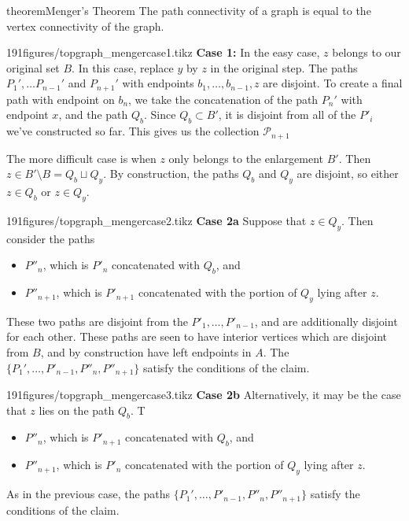\begin{doubledpage}{theorem}{Menger's Theorem}{
	The path connectivity of a graph is equal to the vertex connectivity of the graph.  }
\begin{paragraphfigureenv}{191figures/topgraph_mengercase1.tikz}
    \textbf{Case 1:} In the easy case, $z$ belongs to our original set $B$. In this case, replace $y$ by $z$ in the original step. The paths $P_1', \ldots P_{n-1}'$ and $P_{n+1}'$ with endpoints $b_1, \ldots, b_{n-1}, z$ are disjoint. To create a final path with endpoint on $b_n$, we take the concatenation of the path $P_{n}'$ with endpoint $x$, and the path $Q_b$. Since $Q_b\subset B'$, it is disjoint from all of the $P'_i$ we've constructed so far. This gives us the collection $\mathcal P_{n+1}$ 
\end{paragraphfigureenv}
The more difficult case is when  $z$ only belongs to the enlargement  $B'$. Then $z\in B'\setminus B = Q_b\sqcup Q_y$. By construction, the paths $Q_b$ and $Q_y$ are disjoint, so either $z\in Q_b$ or $z\in Q_y$. 
\begin{paragraphfigureenv}{191figures/topgraph_mengercase2.tikz} \textbf{Case 2a}
    Suppose that $z\in Q_y$. Then consider the paths 
    \begin{itemize}
        \item $P''_n$, which is $P'_n$ concatenated with $Q_b$, and 
        \item $P''_{n+1}$, which is $P'_{n+1}$ concatenated with the portion of $Q_y$ lying after $z$. 
    \end{itemize} 
    These two paths are disjoint from the $P'_1, \ldots, P'_{n-1}$, and are additionally disjoint for each other. These paths are seen to have interior vertices which are disjoint from $B$, and by construction have left endpoints in $A$. The $\{P_1', \ldots, P'_{n-1}, P''_n, P''_{n+1}\}$ satisfy the conditions of the claim. 
\end{paragraphfigureenv}

\begin{paragraphfigureenv}{191figures/topgraph_mengercase3.tikz}
    \textbf{Case 2b}
     Alternatively, it may be the case that $z$ lies on the path $Q_b$. T
     \begin{itemize}
         \item $P''_n$, which is $P'_{n+1}$ concatenated with $Q_b$, and 
         \item $P''_{n+1}$, which is $P'_{n}$ concatenated with the portion of $Q_y$ lying after $z$. 
     \end{itemize}  
     As in the previous case, the paths $\{P_1', \ldots, P'_{n-1}, P''_n, P''_{n+1}\}$ satisfy the conditions of the claim.
\end{paragraphfigureenv} 
\end{doubledpage}